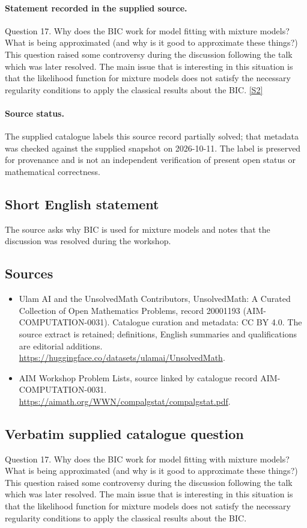 \documentclass[11pt]{article}
\begin{document}
\paragraph{Statement recorded in the supplied source.}
Question 17. Why does the BIC work for model fitting with mixture models? What is being approximated (and why is it good to approximate these things?) This question raised some controversy during the discussion following the talk which was later resolved. The main issue that is interesting in this situation is that the likelihood function for mixture models does not satisfy the necessary regularity conditions to apply the classical results about the BIC. \href{https://aimath.org/WWN/compalgstat/compalgstat.pdf}{[S2]}
\paragraph{Source status.}
The supplied catalogue labels this source record partially solved; that metadata was checked against the supplied snapshot on 2026-10-11. The label is preserved for provenance and is not an independent verification of present open status or mathematical correctness.
\subsection{Short English statement}
The source asks why BIC is used for mixture models and notes that the discussion was resolved during the workshop.
\subsection{Sources}
\begin{itemize}
\item[S1] Ulam AI and the UnsolvedMath Contributors, UnsolvedMath: A Curated Collection of Open Mathematics Problems, record 20001193 (AIM-COMPUTATION-0031). Catalogue curation and metadata: CC BY 4.0. The source extract is retained; definitions, English summaries and qualifications are editorial additions.
\url{https://huggingface.co/datasets/ulamai/UnsolvedMath}.
\item[S2] AIM Workshop Problem Lists, source linked by catalogue record AIM-COMPUTATION-0031.
\url{https://aimath.org/WWN/compalgstat/compalgstat.pdf}.
\end{itemize}
\subsection{Verbatim supplied catalogue question}
Question 17. Why does the BIC work for model fitting with mixture models? What is being approximated (and why is it good to approximate these things?) This question raised some controversy during the discussion following the talk which was later resolved. The main issue that is interesting in this situation is that the likelihood function for mixture models does not satisfy the necessary regularity conditions to apply the classical results about the BIC.
\end{document}
